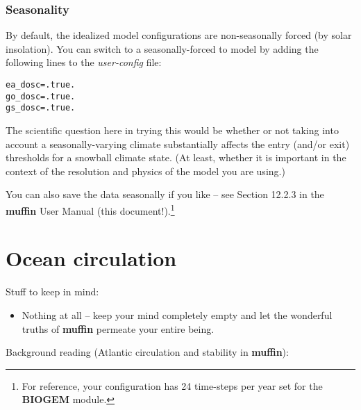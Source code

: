 \documentclass[11pt,fleqn]{book} %
\begin{document}
\subsection{Seasonality}

By default, the idealized model configurations are non-seasonally forced (by solar insolation). You can switch to a seasonally-forced to model by adding the following lines to the \textit{user-config} file:

\vspace{-3mm}
\begin{verbatim}
ea_dosc=.true.
go_dosc=.true.
gs_dosc=.true.
\end{verbatim}
\vspace{-2mm}

The scientific question here in trying this would be whether or not taking into account a seasonally-varying climate substantially affects the entry (and/or exit) thresholds for a snowball climate state. (At least, whether it is important in the context of the resolution and physics of the model you are using.)

You can also save the data seasonally if you like – see Section 12.2.3 in the \textbf{muffin} User Manual (this document!).\footnote{For reference, your configuration has 24 time-steps per year set for the \textbf{BIOGEM} module.}


\cleardoublepage


\chapter{Ocean circulation}

\hfill \break

\noindent Stuff to keep in mind:

\begin{itemize}
\item Nothing at all – keep your mind completely empty and let the wonderful truths of \textbf{muffin} permeate your entire being.
\end{itemize}

\vspace{2mm}
\noindent Background reading (Atlantic circulation and stability in \textbf{muffin}):
\end{document}
